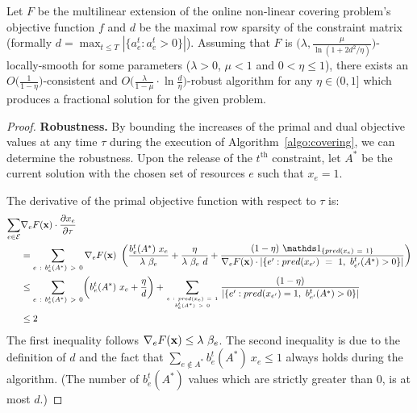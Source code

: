\setcounter{theorem}{0}
\begin{theorem} \label{thm:covering-formal}
	Let $F$ be the multilinear extension of the online non-linear covering problem's objective function $f$ and
	$d$ be the maximal row sparsity of the constraint matrix (formally $d = \max_{t \le T} |\{a^{t}_{e}: a^{t}_{e} > 0\}|$).
	Assuming that $F$ is $\bigl(\lambda, \frac{\mu}{\ln(1+2d^{2}/\eta)}\bigr)$-locally-smooth
	for some parameters ($\lambda > 0$, $\mu < 1$ and $0 < \eta \leq 1$), there exists an $O\bigl( \frac{1}{1 - \eta} \bigr)$-consistent and $O\bigl( \frac{\lambda}{1 - \mu}  \cdot \ln \frac{d}{\eta} \bigr)$-robust algorithm for any $\eta \in (0,1]$ which produces a fractional solution for the given problem.
\end{theorem}
\begin{proof}

\textbf{Robustness.}
By bounding the increases of the primal and dual objective values at any time $\tau$ during the execution of
Algorithm~\ref{algo:covering}, we can determine the robustness. Upon the release of the $t^{\text{th}}$ constraint,
let $A^{*}$ be the current solution with the chosen set of resources $e$ such that $x_{e} = 1$.

\noindent The derivative of the primal objective function with respect to $\tau$ is:
%
\begin{align}	\label{eq:covering-primal}
\sum_{e \in \mathcal{E}} & \nabla_{e} F(\vect{x}) \cdot \frac{\partial x_{e}}{ \partial \tau} \notag \\
&= \sum_{e\ :\ b^{t}_{e}(A^{*})\ >\ 0} \nabla_{e} F(\vect{x})
	\ \left( \frac{b^{t}_{e}(A^{*}) \ x_{e}}{\lambda\ \beta_{e}} + \frac{\eta}{\lambda\ \beta_{e}\ d}
		 + \frac{(1 - \eta) \ \one_{\{pred(x_{e})\ =\ 1\}}}{\nabla_{e} F(\vect{x}) \cdot |\{e': pred(x_{e'})\ =\ 1,\ b^{t}_{e'}(A^{*}) > 0\}| }
 \right)	\notag \\
%
&\leq  \sum_{e\ :\ b^{t}_{e}(A^{*})\ >\ 0} \biggl( b^{t}_{e}(A^{*}) \ x_{e} + \frac{\eta}{d} \biggr)
	+ \sum_{e\ :\ pred(x_e)\ =\ 1 \atop b^{t}_{e}(A^{*})\ >\ 0} \frac{(1 - \eta)}{ |\{e': pred(x_{e'}) = 1,\ b^{t}_{e'}(A^{*}) > 0\}|  } \notag \\
& \leq 2
\end{align}
The first inequality follows $\nabla_{e} F(\mathbf{x}) \leq \lambda \  \beta_{e}$. The second inequality is
due to the definition of $d$ and  the fact that
$\sum_{e \notin A^{*}} b^{t}_{e}(A^{*}) \ x_{e} \leq 1$ always holds during the algorithm. (The number of $b^{t}_{e}(A^{*})$ values which are strictly greater than 0, is at most $d$.)


\end{proof}
